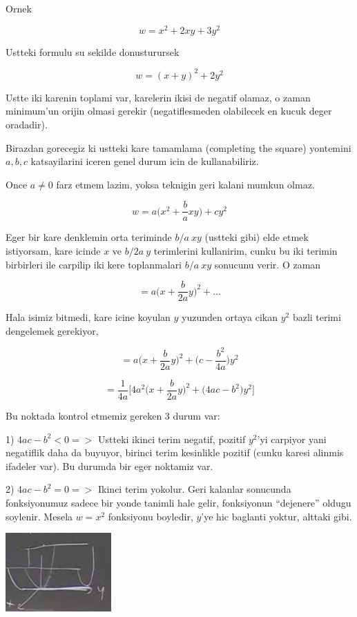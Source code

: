 \documentclass[12pt,fleqn]{article}
\begin{document}
Ornek

\[ w = x^2 + 2xy + 3y^2 \]

Ustteki formulu su sekilde donusturursek

\[ w = (x+y)^2 + 2y^2 \]

Ustte iki karenin toplami var, karelerin ikisi de negatif olamaz, o zaman
minimum'un orijin olmasi gerekir (negatiflesmeden olabilecek en kucuk deger
oradadir). 

Birazdan gorecegiz ki ustteki kare tamamlama (completing the square)
yontemini $a,b,c$ katsayilarini iceren genel durum icin de kullanabiliriz. 

Once $a \ne 0$ farz etmem lazim, yoksa teknigin geri kalani mumkun olmaz. 

\[ w = a \bigg( x^2 + \frac{b}{a} xy \bigg) + cy^2 \]

Eger bir kare denklemin orta teriminde $b/a \ xy$ (ustteki gibi) elde etmek
istiyorsam, kare icinde $x$ ve $b/2a \ y$ terimlerini kullanirim, cunku bu iki
terimin birbirleri ile carpilip iki kere toplanmalari $b/a \ xy$ sonucunu
verir. O zaman

\[ = a \bigg( x + \frac{b}{2a}y  \bigg)^2  + ... \]

Hala isimiz bitmedi, kare icine koyulan $y$ yuzunden ortaya cikan $y^2$ bazli
terimi dengelemek gerekiyor,

\[ = a \bigg( x + \frac{b}{2a}y  \bigg)^2  + 
\bigg( c - \frac{b^2}{4a} \bigg)y^2
 \]


\[ = \frac{1}{4a} 
\bigg[
4a^2 \bigg( x+\frac{b}{2a}y \bigg)^2 +
\bigg(4ac - b^2 \bigg)y^2
\bigg]
\]


Bu noktada kontrol etmemiz gereken 3 durum var:

1) $4ac - b^2 < 0 => $ Ustteki ikinci terim negatif, pozitif $y^2$'yi
carpiyor yani negatiflik daha da buyuyor, birinci terim kesinlikle pozitif
(cunku karesi alinmis ifadeler var). Bu durumda bir eger noktamiz var. 

2)  $4ac - b^2 = 0 => $ Ikinci terim yokolur. Geri kalanlar sonucunda
fonksiyonumuz sadece bir yonde tanimli hale gelir, fonksiyonun ``dejenere''
oldugu soylenir. Mesela $w = x^2$ fonksiyonu boyledir, $y$'ye hic baglanti
yoktur, alttaki gibi.

\includegraphics[height=3cm]{10_2.png}
\end{document}
